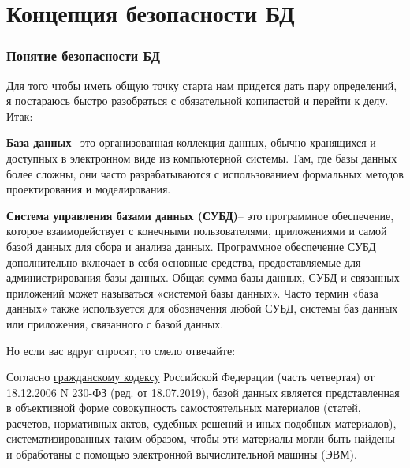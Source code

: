 \section{Концепция безопасности БД}

\subsubsection{Понятие безопасности БД}
Для того чтобы иметь общую точку старта нам придется дать пару определений, я постараюсь быстро разобраться с обязательной копипастой и перейти к делу. Итак:

\begin{grayquote}
	\textbf{База данных}\footnotemark -- это организованная коллекция данных, обычно хранящихся и доступных в электронном виде из компьютерной системы. Там, где базы данных более сложны, они часто разрабатываются с использованием формальных методов проектирования и моделирования.
\end{grayquote}

\begin{grayquote}
	\textbf{Система управления базами данных (СУБД)}\footnotemark[\value{footnote}] -- это программное обеспечение, которое взаимодействует с конечными пользователями, приложениями и самой базой данных для сбора и анализа данных. Программное обеспечение СУБД дополнительно включает в себя основные средства, предоставляемые для администрирования базы данных. Общая сумма базы данных, СУБД и связанных приложений может называться «системой базы данных». Часто термин «база данных» также используется для обозначения любой СУБД, системы баз данных или приложения, связанного с базой данных.
\end{grayquote}

Но если вас вдруг спросят, то смело отвечайте:
\begin{grayquote}
	Согласно \href{http://www.consultant.ru/cons/cgi/online.cgi?rnd=77B9A55845722924B47D00E78BFA3E50\&req=doc\&base=LAW\&n=329334\&dst=100282\&fld=134#2e1eph4wwt8}{гражданскому кодексу} Российской Федерации (часть четвертая) от 18.12.2006 N 230-ФЗ (ред. от 18.07.2019), базой данных является представленная в объективной форме совокупность самостоятельных материалов (статей, расчетов, нормативных актов, судебных решений и иных подобных материалов), систематизированных таким образом, чтобы эти материалы могли быть найдены и обработаны с помощью электронной вычислительной машины (ЭВМ).
\end{grayquote}

